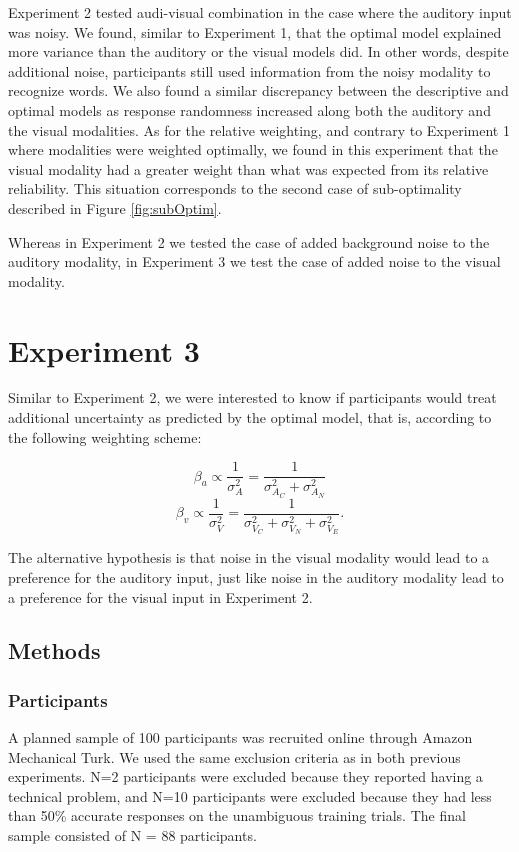\documentclass[english,,man,floatsintext]{apa6}
\theoremstyle{definition}
\theoremstyle{definition}
\theoremstyle{definition}
\theoremstyle{remark}
\begin{document}
Experiment 2 tested audi-visual combination in the case where the
auditory input was noisy. We found, similar to Experiment 1, that the
optimal model explained more variance than the auditory or the visual
models did. In other words, despite additional noise, participants still
used information from the noisy modality to recognize words. We also
found a similar discrepancy between the descriptive and optimal models
as response randomness increased along both the auditory and the visual
modalities. As for the relative weighting, and contrary to Experiment 1
where modalities were weighted optimally, we found in this experiment
that the visual modality had a greater weight than what was expected
from its relative reliability. This situation corresponds to the second
case of sub-optimality described in Figure \ref{fig:subOptim}.

Whereas in Experiment 2 we tested the case of added background noise to
the auditory modality, in Experiment 3 we test the case of added noise
to the visual modality.

\section{Experiment 3}\label{experiment-3}

Similar to Experiment 2, we were interested to know if participants
would treat additional uncertainty as predicted by the optimal model,
that is, according to the following weighting scheme:

\[\beta_a \propto \frac{1}{\sigma^2_{A}} = \frac{1}{\sigma^2_{A_C}+\sigma^2_{A_N}}\]
\[\beta_v \propto \frac{1}{\sigma^2_{V}} = \frac{1}{\sigma^2_{V_C}+\sigma^2_{V_N} + \sigma^2_{V_E}}.\]

The alternative hypothesis is that noise in the visual modality would
lead to a preference for the auditory input, just like noise in the
auditory modality lead to a preference for the visual input in
Experiment 2.

\subsection{Methods}\label{methods-2}

\subsubsection{Participants}\label{participants-2}

A planned sample of 100 participants was recruited online through Amazon
Mechanical Turk. We used the same exclusion criteria as in both previous
experiments. N=2 participants were excluded because they reported having
a technical problem, and N=10 participants were excluded because they
had less than 50\% accurate responses on the unambiguous training
trials. The final sample consisted of N = 88 participants.
\end{document}
